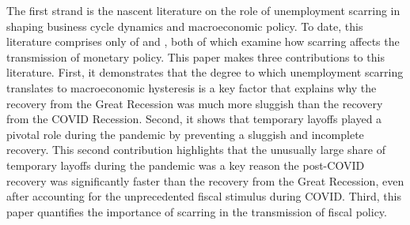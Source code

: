 
The first strand is the nascent literature on the role of unemployment scarring in shaping business cycle dynamics and macroeconomic policy. To date, this literature comprises only of \cite{AlvesViolante2023} and \cite{AlvesViolante2024}, both of which examine how scarring affects the transmission of monetary policy. This paper makes three contributions to this literature. First, it demonstrates that the degree to which unemployment scarring translates to macroeconomic hysteresis is a key factor that explains why the recovery from the Great Recession was much more sluggish than the recovery from the COVID Recession. Second, it shows that temporary layoffs played a pivotal role during the pandemic by preventing a sluggish and incomplete recovery. This second contribution highlights that the unusually large share of temporary layoffs during the pandemic was a key reason the post-COVID recovery was significantly faster than the recovery from the Great Recession, even after accounting for the unprecedented fiscal stimulus during COVID. Third, this paper quantifies the importance of scarring in the transmission of fiscal policy.

